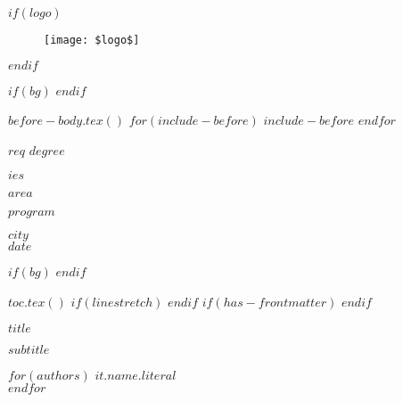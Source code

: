 $if(logo)$
  \begin{figure}[t]
      \centering
      \texttt{[image: \$logo\$]}
  \end{figure}
$endif$


$if(bg)$
$endif$

$before-body.tex()$
$for(include-before)$
$include-before$
$endfor$
\begin{center}
    $req$ $degree$
\end{center}
\vspace{24pt}
\begin{center}
    $ies$
\end{center}
\begin{center}
    $area$
\end{center}
\begin{center}
    $program$
\end{center}
\vspace{24pt}
\begin{center}
    $city$ \\
    $date$
\end{center}

\thispagestyle{empty}
\setcounter{page}{0}

\newpage


$if(bg)$
$endif$


$toc.tex()$
$if(linestretch)$
$endif$
$if(has-frontmatter)$
\mainmatter
$endif$
\newpage

\thispagestyle{empty}

\begin{center}
  \fontsize{18}{16}\selectfont\textbf{$title$}
\end{center}

\begin{center}
  \fontsize{14}{16}\selectfont\textbf{$subtitle$}
\end{center}

\vspace{18pt}

\begin{center}
  $for(authors)$
    $it.name.literal$
    \\
    \vspace{12pt}
  $endfor$
\end{center}



